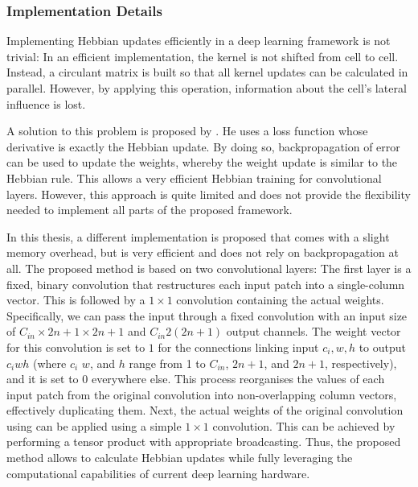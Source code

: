 \subsubsection{Implementation Details}
Implementing Hebbian updates efficiently in a deep learning framework is not trivial: In an efficient implementation, the kernel is not shifted from cell to cell. Instead, a circulant matrix is built so that all kernel updates can be calculated in parallel. However, by applying this operation, information about the cell's lateral influence is lost.

A solution to this problem is proposed by . He uses a loss function whose derivative is exactly the Hebbian update. By doing so, backpropagation of error can be used to update the weights, whereby the weight update is similar to the Hebbian rule.
This allows a very efficient Hebbian training for convolutional layers.
However, this approach is quite limited and does not provide the flexibility needed to implement all parts of the proposed framework.

In this thesis, a different implementation is proposed that comes with a slight memory overhead, but is very efficient and does not rely on backpropagation at all. The proposed method is based on two convolutional layers: The first layer is a fixed, binary convolution that restructures each input patch into a single-column vector. This is followed by a $1\times1$ convolution containing the actual weights. Specifically, we can pass the input through a fixed convolution with an input size of $C_{in} \times 2n+1 \times 2n+1$ and $C_{in} 2(2n+1)$ output channels. The weight vector for this convolution is set to $1$ for the connections linking input $c_i,w,h$ to output $c_iwh$ (where $c_i$ $w$, and $h$ range from 1 to $C_{in}$, $2n+1$, and $2n+1$, respectively), and it is set to 0 everywhere else. This process reorganises the values of each input patch from the original convolution into non-overlapping column vectors, effectively duplicating them. Next, the actual weights of the original convolution using can be applied using a simple $1\times1$ convolution. This can be achieved by performing a tensor product with appropriate broadcasting.
Thus, the proposed method allows to calculate Hebbian updates while fully leveraging the computational capabilities of current deep learning hardware.














